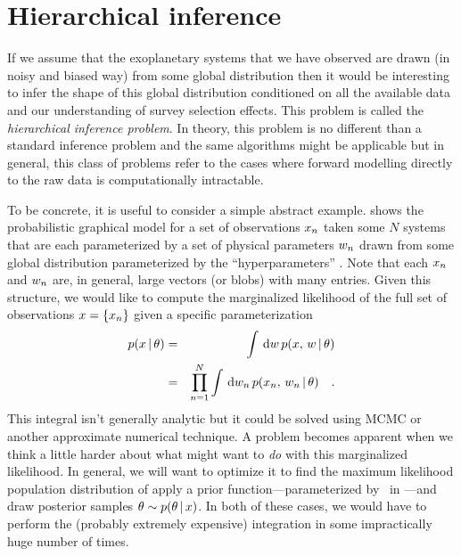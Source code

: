 \documentclass[12pt,preprint]{aastex}
\begin{document}
\section{Hierarchical inference}

If we assume that the exoplanetary systems that we have observed are drawn (in
noisy and biased way) from some global distribution then it would be
interesting to infer the shape of this global distribution conditioned on all
the available data and our understanding of survey selection effects.
This problem is called the \emph{hierarchical inference problem}.
In theory, this problem is no different than a standard inference problem and
the same algorithms might be applicable but in general, this class of problems
refer to the cases where forward modelling directly to the raw data is
computationally intractable.

To be concrete, it is useful to consider a simple abstract example.
 shows the probabilistic graphical model for a set of
observations $x_n$ taken some $N$ systems that are each parameterized by a
set of physical parameters $w_n$ drawn from some global distribution
parameterized by the ``hyperparameters'' \hyper.
Note that each $x_n$ and $w_n$ are, in general, large vectors (or
blobs) with many entries.
Given this structure, we would like to compute the marginalized likelihood of
the full set of observations $x = \{ x_n \}$ given a specific
parameterization \hyper
\begin{eqnarray}
p(\data\,|\,\hyper) &=& \int \dd \local\,p(\data,\,\local\,|\,\hyper)
\nonumber\\
&=& \prod_{n=1}^N\int \dd \local_n\,p(\data_n,\,\local_n\,|\,\hyper) \quad.
\eqlabel{marg-like}
\end{eqnarray}
This integral isn't generally analytic but it could be solved using MCMC or
another approximate numerical technique.
A problem becomes apparent when we think a little harder about what might want
to \emph{do} with this marginalized likelihood.
In general, we will want to optimize it to find the maximum likelihood
population distribution of apply a prior function---parameterized by
\hyperhyper\ in ---and draw posterior samples
$\theta \sim p(\theta\,|\,x)$.
In both of these cases, we would have to perform the (probably extremely
expensive) integration in  some impractically huge number of
times.
\end{document}
